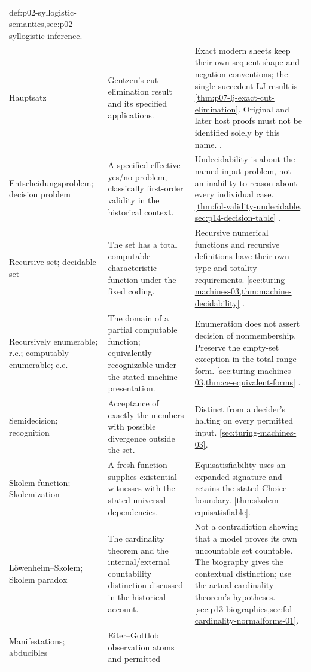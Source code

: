 \begin{longtable}{@{}p{}p{}p{}@{}}
{def:p02-syllogistic-semantics,sec:p02-syllogistic-inference}. \\
Hauptsatz & Gentzen's cut-elimination result and its specified
applications. & Exact modern sheets keep their own sequent shape and
negation conventions; the single-succedent LJ result is
\cref{thm:p07-lj-exact-cut-elimination}. Original and later host proofs
must not be identified solely by this name. \cite{Gentzen1934a,Gentzen1935b}. \\
Entscheidungsproblem; decision problem & A specified effective yes/no
problem, classically first-order validity in the historical context. &
Undecidability is about the named input problem, not an inability to reason
about every individual case. \cref{thm:fol-validity-undecidable,
sec:p14-decision-table} \cite{Church1936,Turing1937}. \\
Recursive set; decidable set & The set has a total computable characteristic
function under the fixed coding. & Recursive numerical functions and
recursive definitions have their own type and totality requirements.
\cref{sec:turing-machines-03,thm:machine-decidability}
\cite{Shoenfield1967}. \\
Recursively enumerable; r.e.; computably enumerable; c.e. & The domain of
a partial computable function; equivalently recognizable under the stated
machine presentation. & Enumeration does not assert decision of
nonmembership. Preserve the empty-set exception in the total-range form.
\cref{sec:turing-machines-03,thm:ce-equivalent-forms}
\cite{Shoenfield1967}. \\
Semidecision; recognition & Acceptance of exactly the members with possible
divergence outside the set. & Distinct from a decider's halting on every
permitted input. \cref{sec:turing-machines-03}. \\
Skolem function; Skolemization & A fresh function supplies existential
witnesses with the stated universal dependencies. & Equisatisfiability
uses an expanded signature and retains the stated Choice boundary.
\cref{thm:skolem-equisatisfiable}. \\
L\"owenheim--Skolem; Skolem paradox & The cardinality theorem and the
internal/external countability distinction discussed in the historical
account. & Not a contradiction showing that a model proves its own
uncountable set countable. The biography gives the contextual distinction;
use the actual cardinality theorem's hypotheses.
\cref{sec:p13-biographies,sec:fol-cardinality-normalforms-01}. \\
Manifestations; abducibles & Eiter--Gottlob observation atoms and permitted

\end{longtable}
